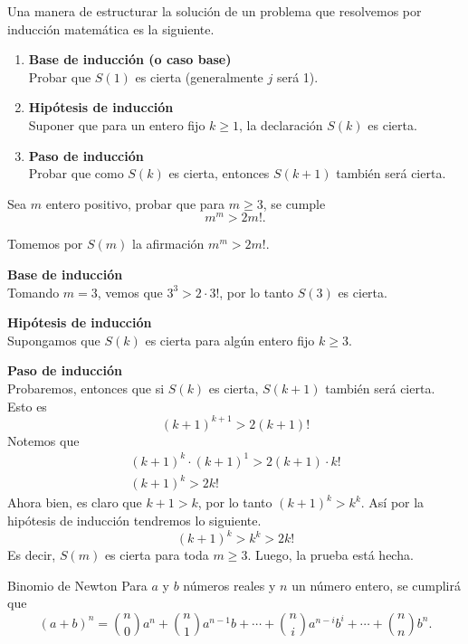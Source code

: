 Una manera de estructurar la solución de un problema que resolvemos por inducción matemática es la siguiente.
\begin{enumerate}
    \item \textbf{Base de inducción (o caso base)}\\
    Probar que $S(1)$ es cierta (generalmente $j$ será 1).

    \item \textbf{Hipótesis de inducción}\\
    Suponer que para un entero fijo $k \geq 1$, la declaración $S(k)$ es cierta.

    \item \textbf{Paso de inducción}\\
    Probar que como $S(k)$ es cierta, entonces $S(k + 1)$ también será cierta.
\end{enumerate}

\begin{section-example.tcb}
    Sea $m$ entero positivo, probar que para $m \geq 3$, se cumple \[m^m > 2m!.\]
\end{section-example.tcb}

\begin{solution}
    Tomemos por $S(m)$ la afirmación $m^m > 2m!$.

    \textbf{Base de inducción}\\
    Tomando $m = 3$, vemos que $3^3 > 2\cdot3!$, por lo tanto $S(3)$ es cierta.

    \textbf{Hipótesis de inducción}\\
    Supongamos que $S(k)$ es cierta para algún entero fijo $k\geq 3$.

    \textbf{Paso de inducción}\\
    Probaremos, entonces que si $S(k)$ es cierta, $S(k + 1)$ también será cierta.
    Esto es
    \[(k + 1)^{k + 1} > 2(k + 1)!\]
    Notemos que
    \begin{gather*}
    (k + 1)^{k}\cdot(k + 1)^1 > 2(k + 1)\cdot k!\\
    (k + 1)^k > 2k!
    \end{gather*}
    Ahora bien, es claro que $k + 1 > k$, por lo tanto $(k + 1)^k > k^k$.
    Así por la hipótesis de inducción tendremos lo siguiente.
    \[(k + 1)^k > k^k > 2k!\]
    Es decir, $S(m)$ es cierta para toda $m\geq 3$.
    Luego, la prueba está hecha.
\end{solution}

\begin{section-theorem.tcb}{Binomio de Newton}{}
    Para $a$ y $b$ números reales y $n$ un número entero, se cumplirá que
    \[(a + b)^n = \binom{n}{0}a^n + \binom{n}{1}a^{n - 1}b + \cdots + \binom{n}{i}a^{n - i}b^i + \cdots + \binom{n}{n}b^n.\]
\end{section-theorem.tcb}

